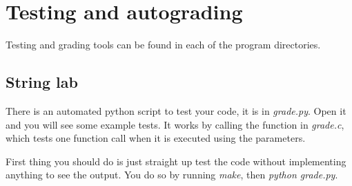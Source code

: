 \documentclass[11pt]{article}
\begin{document}





\section{Testing and autograding}

Testing and grading tools can be found in each of the program directories.

\subsection{String lab}

There is an automated python script to test your code, it is in \textit{grade.py}. Open it and you will see
some example tests. It works by calling the function in \textit{grade.c}, which tests one function call
when it is executed using the parameters.

First thing you should do is just straight up test the code without implementing anything to see
the output. You do so by running \textit{make}, then \textit{python grade.py}.
\end{document}
